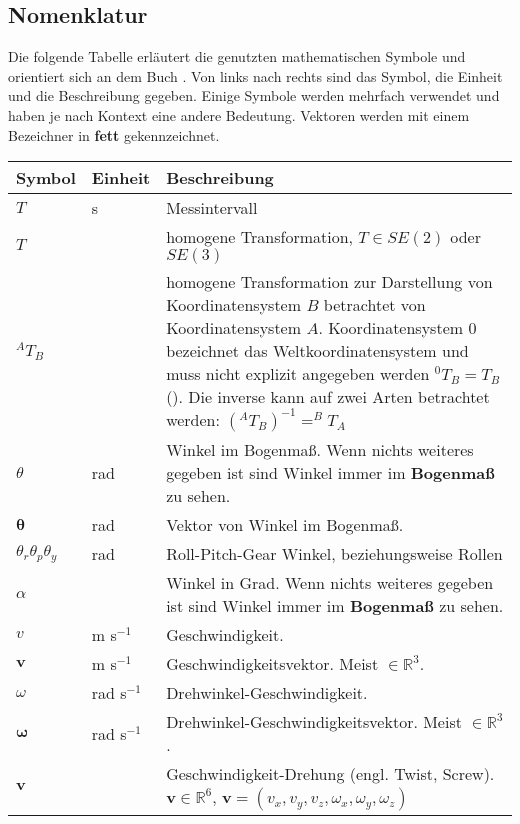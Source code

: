 \subsection{Nomenklatur}
\label{sec:basic-math}
    
  Die folgende Tabelle erläutert die genutzten mathematischen Symbole und orientiert sich an dem Buch \cite{Corke2011}. Von links nach rechts sind das Symbol, die Einheit und die Beschreibung gegeben. Einige Symbole werden mehrfach verwendet und haben je nach Kontext eine andere Bedeutung. Vektoren werden mit einem Bezeichner in \textbf{fett} gekennzeichnet.

  \begin{table}[h]%
  \begin{tabularx}{\columnwidth}{|l|l|X|}
  	\hline Symbol & Einheit & Beschreibung \\ 
  	\hline $T$ & s & Messintervall \\
 	\hline $T$ &  & homogene Transformation, $T \in SE(2)$ oder $SE(3)$ \\
 	\hline $^AT_B$ &  & homogene Transformation zur Darstellung von Koordinatensystem $ B $ betrachtet von Koordinatensystem $ A $. Koordinatensystem $ 0 $ bezeichnet das Weltkoordinatensystem und muss nicht explizit angegeben werden $^0T_B = T_B$(). Die inverse kann auf zwei Arten betrachtet werden: $(^AT_B)^{-1} = ^BT_A $ \\
 	\hline $\theta$ & rad & Winkel im Bogenmaß. Wenn nichts weiteres gegeben ist sind Winkel immer im \textbf{Bogenmaß} zu sehen. \\ 
 	\hline $ \pmb{\theta}$ & rad & Vektor von Winkel im Bogenmaß. \\ 
	\hline $\theta_r \theta_p \theta_y$ & rad & Roll-Pitch-Gear Winkel, beziehungsweise Rollen \\
 	\hline $\alpha$ & \textdegree & Winkel in Grad. Wenn nichts weiteres gegeben ist sind Winkel immer im \textbf{Bogenmaß} zu sehen. \\
 	\hline $v$ & m s$^{-1}$ & Geschwindigkeit. \\
 	\hline $\pmb{v}$ &  m s$^{-1}$  & Geschwindigkeitsvektor. Meist $\in \mathds{R}^3$. \\
 	\hline $\omega$ & rad s$^{-1}$ & Drehwinkel-Geschwindigkeit. \\
 	\hline $\pmb{\omega}$ &  rad s$^{-1}$  & Drehwinkel-Geschwindigkeitsvektor. Meist $\in \mathds{R}^3$. \\
 	\hline $\pmb{v}$ &  & Geschwindigkeit-Drehung (engl. Twist, Screw).  $\pmb{v} \in \mathds{R}^6$, $\pmb{v} = (v_x, v_y, v_z,\omega_x, \omega_y, \omega_z)$ \\

\end{tabularx}
\end{table}
